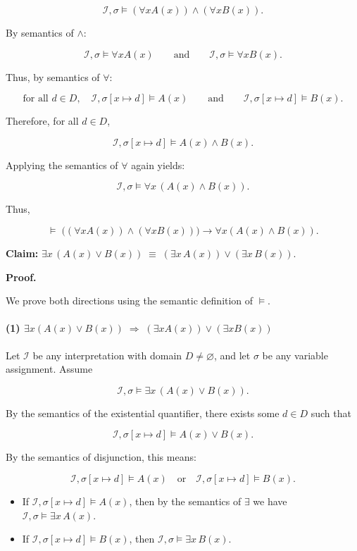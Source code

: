 \documentclass{article}
\theoremstyle{plain}
\theoremstyle{definition}
\theoremstyle{remark}
\begin{document}
\[
\mathcal{I},\sigma \vDash (\forall xA(x))\land(\forall xB(x)).
\]

By semantics of $\land$:

\[
\mathcal{I},\sigma \vDash \forall xA(x)
\qquad\text{and}\qquad
\mathcal{I},\sigma \vDash \forall xB(x).
\]

Thus, by semantics of $\forall$:

\[
\text{for all } d\in D,\quad 
\mathcal{I},\sigma[x\mapsto d] \vDash A(x)
\qquad\text{and}\qquad
\mathcal{I},\sigma[x\mapsto d] \vDash B(x).
\]

Therefore, for all $d\in D$,

\[
\mathcal{I},\sigma[x\mapsto d] \vDash A(x)\land B(x).
\]

Applying the semantics of $\forall$ again yields:

\[
\mathcal{I},\sigma \vDash \forall x\, (A(x)\land B(x)).
\]

Thus,

\[
\models\; \bigl((\forall xA(x))\land(\forall xB(x))\bigr)
     \to \forall x(A(x)\land B(x)).
\]


\textbf{Claim: } 
$\exists x\, (A(x)\lor B(x)) \;\equiv\; (\exists x\,A(x)) \lor (\exists x\,B(x)).$


\bigskip
\textbf{Proof.}

We prove both directions using the semantic definition of $\vDash$.

\paragraph{(1) $\exists x(A(x)\lor B(x)) \;\Rightarrow\; (\exists xA(x))\lor(\exists xB(x))$}

Let $\mathcal{I}$ be any interpretation with domain $D\neq\varnothing$, and
let $\sigma$ be any variable assignment.  
Assume

\[
\mathcal{I},\sigma \vDash \exists x\,(A(x)\lor B(x)).
\]

By the semantics of the existential quantifier, there exists some
$d\in D$ such that

\[
\mathcal{I},\sigma[x\mapsto d] \vDash A(x)\lor B(x).
\]

By the semantics of disjunction, this means:

\[
\mathcal{I},\sigma[x\mapsto d] \vDash A(x)
\quad\text{or}\quad
\mathcal{I},\sigma[x\mapsto d] \vDash B(x).
\]

\begin{itemize}
    \item If $\mathcal{I},\sigma[x\mapsto d] \vDash A(x)$, then by the
    semantics of $\exists$ we have
    $\mathcal{I},\sigma \vDash \exists x\,A(x)$.

    \item If $\mathcal{I},\sigma[x\mapsto d] \vDash B(x)$, then
    $\mathcal{I},\sigma \vDash \exists x\,B(x)$.
\end{itemize}
\end{document}
